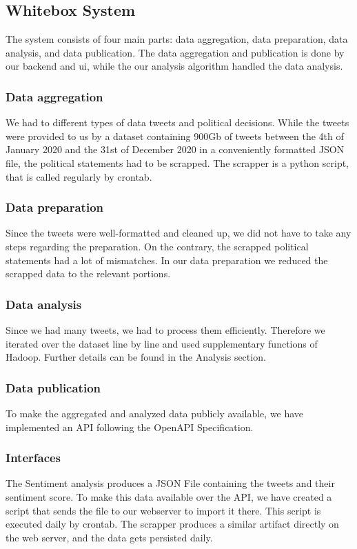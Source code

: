 \documentclass[
    fontsize=12pt,
    headings=small,
    parskip=half,           %
    bibliography=totoc,
    numbers=noenddot,       %
    open=any,               %
    ]{scrreprt}
\begin{document}
\newpage

\subsection{Whitebox System}
The system consists of four main parts: data aggregation, data preparation, data analysis, and data publication. The data aggregation and publication is done by our backend and ui, while the our analysis algorithm handled the data analysis. 

\subsubsection*{Data aggregation}
We had to different types of data tweets and political decisions. While the tweets were provided to us by a dataset containing 900Gb of tweets between the 4th of January 2020 and the 31st of December 2020 in a conveniently formatted JSON file, the political statements had to be scrapped. The scrapper is a python script, that is called regularly by crontab.

\subsubsection*{Data preparation}
Since the tweets were well-formatted and cleaned up, we did not have to take any steps regarding the preparation. On the contrary, the scrapped political statements had a lot of mismatches. In our data preparation we reduced the scrapped data to the relevant portions.

\subsubsection*{Data analysis}
Since we had many tweets, we had to process them efficiently. Therefore we iterated over the dataset line by line and used supplementary functions of Hadoop. Further details can be found in the Analysis section.

\subsubsection*{Data publication}
To make the aggregated and analyzed data publicly available, we have implemented an API following the OpenAPI Specification.

\subsubsection*{Interfaces}
The Sentiment analysis produces a JSON File containing the tweets and their sentiment score. To make this data available over the API, we have created a script that sends the file to our webserver to import it there. This script is executed daily by crontab.
The scrapper produces a similar artifact directly on the web server, and the data gets persisted daily.
\end{document}
